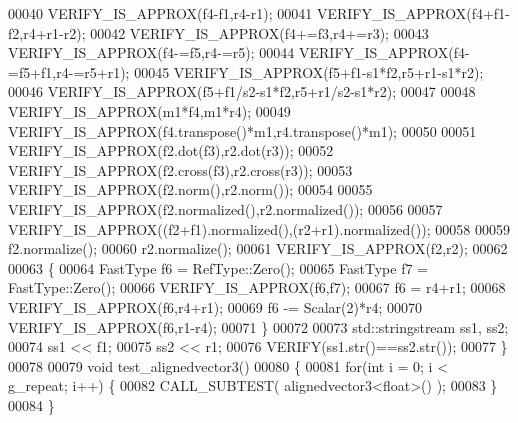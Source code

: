 \begin{DoxyCode}
00040   VERIFY\_IS\_APPROX(f4-f1,r4-r1);
00041   VERIFY\_IS\_APPROX(f4+f1-f2,r4+r1-r2);
00042   VERIFY\_IS\_APPROX(f4+=f3,r4+=r3);
00043   VERIFY\_IS\_APPROX(f4-=f5,r4-=r5);
00044   VERIFY\_IS\_APPROX(f4-=f5+f1,r4-=r5+r1);
00045   VERIFY\_IS\_APPROX(f5+f1-s1*f2,r5+r1-s1*r2);
00046   VERIFY\_IS\_APPROX(f5+f1/s2-s1*f2,r5+r1/s2-s1*r2);
00047   
00048   VERIFY\_IS\_APPROX(m1*f4,m1*r4);
00049   VERIFY\_IS\_APPROX(f4.transpose()*m1,r4.transpose()*m1);
00050   
00051   VERIFY\_IS\_APPROX(f2.dot(f3),r2.dot(r3));
00052   VERIFY\_IS\_APPROX(f2.cross(f3),r2.cross(r3));
00053   VERIFY\_IS\_APPROX(f2.norm(),r2.norm());
00054 
00055   VERIFY\_IS\_APPROX(f2.normalized(),r2.normalized());
00056 
00057   VERIFY\_IS\_APPROX((f2+f1).normalized(),(r2+r1).normalized());
00058   
00059   f2.normalize();
00060   r2.normalize();
00061   VERIFY\_IS\_APPROX(f2,r2);
00062   
00063   \{
00064     FastType f6 = RefType::Zero();
00065     FastType f7 = FastType::Zero();
00066     VERIFY\_IS\_APPROX(f6,f7);
00067     f6 = r4+r1;
00068     VERIFY\_IS\_APPROX(f6,r4+r1);
00069     f6 -= Scalar(2)*r4;
00070     VERIFY\_IS\_APPROX(f6,r1-r4);
00071   \}
00072   
00073   std::stringstream ss1, ss2;
00074   ss1 << f1;
00075   ss2 << r1;
00076   VERIFY(ss1.str()==ss2.str());
00077 \}
00078 
00079 \textcolor{keywordtype}{void} test\_alignedvector3()
00080 \{
00081   \textcolor{keywordflow}{for}(\textcolor{keywordtype}{int} i = 0; i < g\_repeat; i++) \{
00082     CALL\_SUBTEST( alignedvector3<float>() );
00083   \}
00084 \}
\end{DoxyCode}

